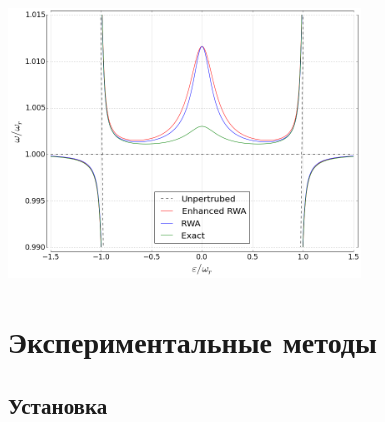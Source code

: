 \documentclass[aspectratio=169, 13pt]{beamer}
\begin{document}
\begin{frame}[c]
\begin{columns}[c]
\end{columns}
\end{frame}

\begin{frame}[c]\frametitle{\secname}\framesubtitle{\subsecname}
\centering
\includegraphics[width=0.7\textwidth]{Rabi_anticrossing}
\end{frame}

\section{Экспериментальные методы}
\subsection{Установка}
\end{document}
